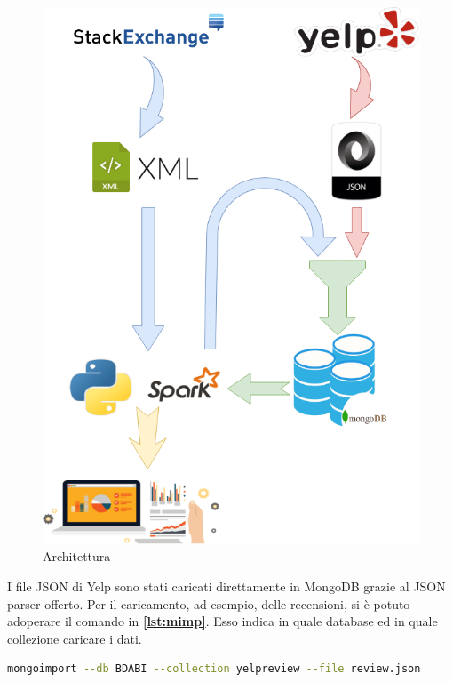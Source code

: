 \begin{figure}[H]
	\centering
	\includegraphics[scale=0.5]{./image/BDABI.png}
	\caption{Architettura}
	\label{fig:arc}
\end{figure}
I file JSON di Yelp sono stati caricati direttamente in MongoDB grazie al JSON parser offerto.
Per il caricamento, ad esempio, delle recensioni, si è potuto adoperare il comando in \textbf{\ref{lst:mimp}}. Esso indica in quale database ed in quale collezione caricare i dati.\par

\begin{lstlisting}[language=Bash, caption={Yelp Dataset Loading}, captionpos=b, label={lst:mimp}]
mongoimport --db BDABI --collection yelpreview --file review.json
\end{lstlisting}
 
